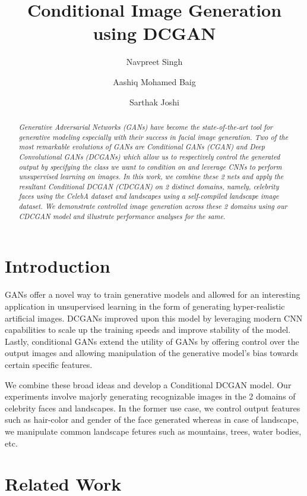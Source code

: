 \documentclass[twocolumn,10pt,cleanfoot]{asme2ej}
\title{Conditional Image Generation using DCGAN}
\author{Navpreet Singh
    \affiliation{
    CIMS\\
    New York University\\
    Email: ns4647@nyu.edu
    }
}
\author{Aashiq Mohamed Baig
    \affiliation{
    CIMS\\
    New York University\\
    Email: amb1558@nyu.edu
    }
}
\author{Sarthak Joshi
    \affiliation{
    CIMS\\
    New York University\\
    Email: sj2810@nyu.edu
    }
}
\begin{document}
\maketitle    

\begin{abstract}
{\it 
Generative Adversarial Networks (GANs) have become the state-of-the-art tool for generative modeling especially with their success in facial image generation. Two of the most remarkable evolutions of GANs are Conditional GANs (CGAN) and Deep Convolutional GANs (DCGANs) which allow us to respectively control the generated output by specifying the class we want to condition on and leverage CNNs to perform unsupervised learning on images. In this work, we combine these 2 nets and apply the resultant Conditional DCGAN (CDCGAN) on 2 distinct domains, namely, celebrity faces using the CelebA dataset and landscapes using a self-compiled landscape image dataset. We demonstrate controlled image generation across these 2 domains using  our CDCGAN model and illustrate performance analyses for the same.
}
\end{abstract}

\section{Introduction}
GANs offer a novel way to train generative models and allowed for an interesting application in unsupervised learning in the form of generating hyper-realistic artificial images. DCGANs improved upon this model by leveraging modern CNN capabilities to scale up the training speeds and improve stability of the model. Lastly, conditional GANs extend the utility of GANs by offering control over the output images and allowing manipulation of the generative model's bias towards certain specific features.

We combine these broad ideas and develop a Conditional DCGAN model. Our experiments involve majorly generating recognizable images in the 2 domains of celebrity faces and landscapes. In the former use case, we control output features such as hair-color and gender of the face generated whereas in case of landscape, we manipulate common landscape fetures such as mountains, trees, water bodies, etc.

\section{Related Work}
\end{document}
